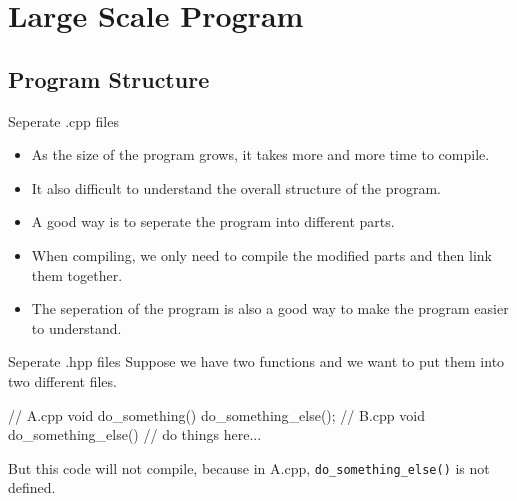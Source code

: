 \section{Large Scale Program}
\subsection{Program Structure}
\begin{frame}{Seperate .cpp files}
  \begin{itemize}
    \item As the size of the program grows, it takes more and more time to compile.
    \item It also difficult to understand the overall structure of the program.\pause
    \item A good way is to seperate the program into different parts. 
    \item When compiling, we only need to compile the modified parts and then link them together.
    \item The seperation of the program is also a good way to make the program easier to understand.
  \end{itemize}
\end{frame}
\begin{frame}[fragile]{Seperate .hpp files}
  Suppose we have two functions and we want to put them into two different files.
  \begin{cpp}
    // A.cpp
    void do_something() {
      do_something_else();
    }
    // B.cpp
    void do_something_else() {
      // do things here...
    }
      \end{cpp}
    But this code will not compile, because in A.cpp, \texttt{do\_something\_else()} is not defined.
\end{frame}

